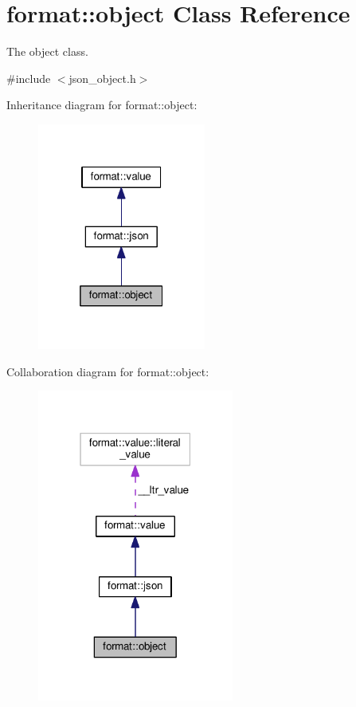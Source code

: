 \hypertarget{classformat_1_1object}{}\section{format\+:\+:object Class Reference}
\label{classformat_1_1object}


The object class.  




{\ttfamily \#include $<$json\+\_\+object.\+h$>$}



Inheritance diagram for format\+:\+:object\+:
\nopagebreak
\begin{figure}[H]
\begin{center}
\leavevmode
\includegraphics[width=157pt]{classformat_1_1object__inherit__graph}
\end{center}
\end{figure}


Collaboration diagram for format\+:\+:object\+:
\nopagebreak
\begin{figure}[H]
\begin{center}
\leavevmode
\includegraphics[width=183pt]{classformat_1_1object__coll__graph}
\end{center}
\end{figure}
